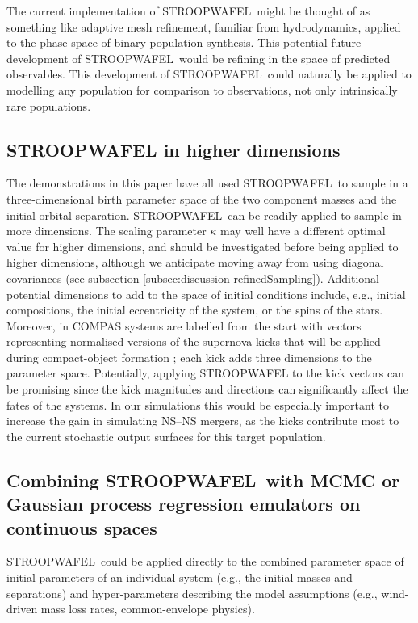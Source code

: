 \documentclass[a4paper,fleqn,usenatbib,useAMS,usedcolumn]{mnras}
\newcommand{\AISs}{\textsc{STROOPWAFEL}}
\begin{document}
The current implementation of \AISs \ might be thought of as something like adaptive mesh refinement, familiar from hydrodynamics, applied to the phase space of binary population synthesis.   This potential future development of \AISs \ would be refining in the space of predicted observables.   This development of  \AISs \ could naturally be applied to modelling any population for comparison to observations, not only intrinsically rare populations. 


\subsection{\AISs{} in higher dimensions}
\label{subsec:DiscussionHigherDim}

The demonstrations in this paper have all used \AISs \ to sample in a three-dimensional birth parameter space of the two component masses and the initial orbital separation.  \AISs \ can be readily applied to sample in more dimensions. The scaling parameter $\kappa$ may well have a different optimal value for higher dimensions, and should be investigated before being applied to higher dimensions, although we anticipate moving away from using diagonal covariances (see subsection \ref{subsec:discussion-refinedSampling}). Additional potential dimensions to add to the space of initial conditions include, e.g., initial compositions, the initial eccentricity of the system, or the spins of the stars.   Moreover, in \textsc{COMPAS} systems are labelled from the start with vectors representing normalised versions of the supernova kicks that will be applied during compact-object formation \citep[see also, e.g.,][]{andrews2017dart_board}; each kick adds three dimensions to the parameter space. Potentially, applying \AISs{} to the kick vectors can be promising since the kick magnitudes and directions can significantly affect the fates of the systems. In our simulations this would be especially important to increase the gain in simulating NS--NS mergers, as the kicks contribute most to the current stochastic output surfaces for this target population. 


\subsection{Combining  \AISs \ with MCMC or Gaussian process regression emulators on continuous spaces}
\label{subsec:DiscussionContinuousSpaces}
%
\AISs \ could be applied directly to the combined parameter space of initial parameters of an individual system (e.g., the initial masses and separations) and hyper-parameters describing the model assumptions (e.g., wind-driven mass loss rates, common-envelope physics).  
\end{document}
